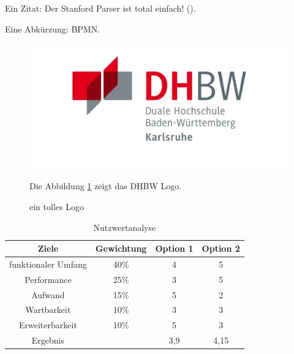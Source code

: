 Ein Zitat: Der Stanford Parser ist total einfach! (\cite[vgl.][274]{STANFORDNLP}).\par 
Eine Abkürzung: \ac{BPMN}.\par

\begin{figure}[H]
\noindent\includegraphics[width=\linewidth,height=\textheight,
keepaspectratio]{pictures/dhbw_logo.png}
\caption{ein tolles Logo}
\label{fig:DHBW}

Die Abbildung \ref{fig:DHBW} zeigt das DHBW Logo.
\end{figure}

\begin{table}[h!]
  \centering
  \begin{tabular}{cccc}
    \toprule
    Ziele & Gewichtung & Option 1 & Option 2\\
    \midrule
	funktionaler Umfang  	& 40\% & 4 & 5 \\    
	Performance 	& 25\% & 3 & 5 \\    
    Aufwand 		& 15\% & 5 & 2 \\
    Wartbarkeit 	& 10\% & 3 & 3 \\
    Erweiterbarkeit & 10\% & 5 & 3 \\
    \midrule
    Ergebnis 		& 	   & 3,9 & 4,15 \\
    \bottomrule
  \end{tabular}
  \caption{Nutzwertanalyse}
  \label{tab:table1}
\end{table}